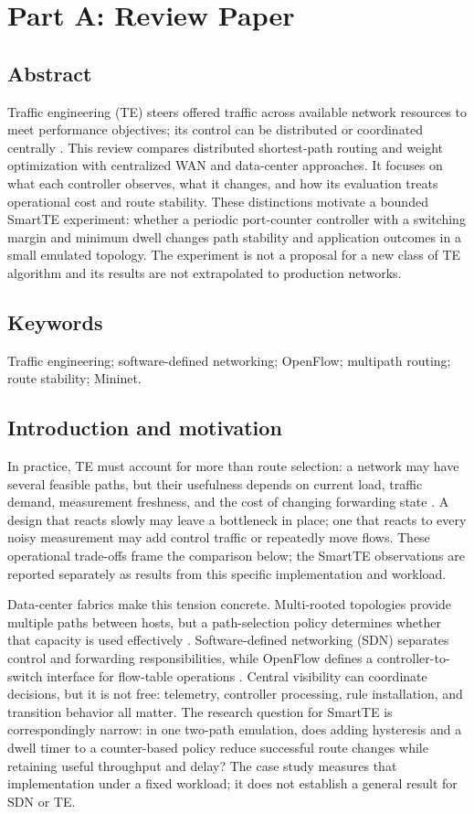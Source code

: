 \section{Part A: Review Paper}
\subsection{Abstract}
Traffic engineering (TE) steers offered traffic across available network resources to meet performance objectives; its control can be distributed or coordinated centrally \cite{fortz2002}. This review compares distributed shortest-path routing and weight optimization with centralized WAN and data-center approaches. It focuses on what each controller observes, what it changes, and how its evaluation treats operational cost and route stability. These distinctions motivate a bounded SmartTE experiment: whether a periodic port-counter controller with a switching margin and minimum dwell changes path stability and application outcomes in a small emulated topology. The experiment is not a proposal for a new class of TE algorithm and its results are not extrapolated to production networks.

\subsection{Keywords}
Traffic engineering; software-defined networking; OpenFlow; multipath routing; route stability; Mininet.

\subsection{Introduction and motivation}
In practice, TE must account for more than route selection: a network may have several feasible paths, but their usefulness depends on current load, traffic demand, measurement freshness, and the cost of changing forwarding state \cite{fortz2000,fortz2002}. A design that reacts slowly may leave a bottleneck in place; one that reacts to every noisy measurement may add control traffic or repeatedly move flows. These operational trade-offs frame the comparison below; the SmartTE observations are reported separately as results from this specific implementation and workload.

Data-center fabrics make this tension concrete. Multi-rooted topologies provide multiple paths between hosts, but a path-selection policy determines whether that capacity is used effectively \cite{alfares2008,greenberg2009}. Software-defined networking (SDN) separates control and forwarding responsibilities, while OpenFlow defines a controller-to-switch interface for flow-table operations \cite{rfc7426,openflow13,openflow2008}. Central visibility can coordinate decisions, but it is not free: telemetry, controller processing, rule installation, and transition behavior all matter. The research question for SmartTE is correspondingly narrow: in one two-path emulation, does adding hysteresis and a dwell timer to a counter-based policy reduce successful route changes while retaining useful throughput and delay? The case study measures that implementation under a fixed workload; it does not establish a general result for SDN or TE.

